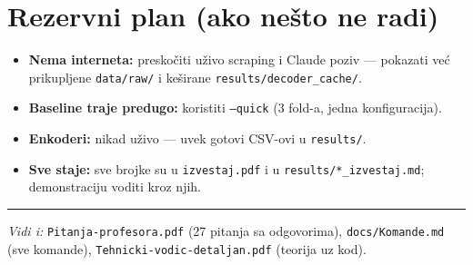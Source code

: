 \documentclass[11pt,a4paper]{article}
\newcommand{\kod}[1]{\texttt{#1}}
\begin{document}
\section{Rezervni plan (ako nešto ne radi)}
\begin{itemize}[nosep]
  \item \textbf{Nema interneta:} preskočiti uživo scraping i Claude poziv --- pokazati
    već prikupljene \kod{data/raw/} i keširane \kod{results/decoder\_cache/}.
  \item \textbf{Baseline traje predugo:} koristiti \kod{--quick} (3 fold-a, jedna
    konfiguracija).
  \item \textbf{Enkoderi:} nikad uživo --- uvek gotovi CSV-ovi u \kod{results/}.
  \item \textbf{Sve staje:} sve brojke su u \kod{izvestaj.pdf} i u
    \kod{results/*\_izvestaj.md}; demonstraciju voditi kroz njih.
\end{itemize}

\vspace{2mm}\hrule\vspace{2mm}
\noindent\textit{Vidi i:} \texttt{Pitanja-profesora.pdf} (27 pitanja sa odgovorima),
\texttt{docs/Komande.md} (sve komande), \texttt{Tehnicki-vodic-detaljan.pdf}
(teorija uz kod).
\end{document}
